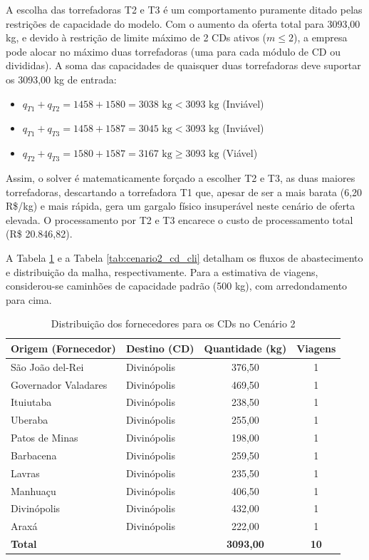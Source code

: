\documentclass[a4paper,11pt]{article}
\begin{document}
A escolha das torrefadoras T2 e T3 é um comportamento puramente ditado pelas restrições de capacidade do modelo. Com o aumento da oferta total para 3093,00 kg, e devido à restrição de limite máximo de 2 CDs ativos ($m \le 2$), a empresa pode alocar no máximo duas torrefadoras (uma para cada módulo de CD ou divididas). A soma das capacidades de quaisquer duas torrefadoras deve suportar os 3093,00 kg de entrada:
\begin{itemize}
    \item $q_{T1} + q_{T2} = 1458 + 1580 = 3038 \text{ kg} < 3093 \text{ kg}$ (Inviável)
    \item $q_{T1} + q_{T3} = 1458 + 1587 = 3045 \text{ kg} < 3093 \text{ kg}$ (Inviável)
    \item $q_{T2} + q_{T3} = 1580 + 1587 = 3167 \text{ kg} \ge 3093 \text{ kg}$ (Viável)
\end{itemize}

Assim, o solver é matematicamente forçado a escolher T2 e T3, as duas maiores torrefadoras, descartando a torrefadora T1 que, apesar de ser a mais barata (6,20 R\$/kg) e mais rápida, gera um gargalo físico insuperável neste cenário de oferta elevada. O processamento por T2 e T3 encarece o custo de processamento total (R\$ 20.846,82).

A Tabela \ref{tab:cenario2_forn_cd} e a Tabela \ref{tab:cenario2_cd_cli} detalham os fluxos de abastecimento e distribuição da malha, respectivamente. Para a estimativa de viagens, considerou-se caminhões de capacidade padrão (500 kg), com arredondamento para cima.

\begin{table}[H]
\centering
\begin{tabular}{llcc}
\hline
\textbf{Origem (Fornecedor)} & \textbf{Destino (CD)} & \textbf{Quantidade (kg)} & \textbf{Viagens} \\ \hline
São João del-Rei & Divinópolis & 376,50 & 1 \\
Governador Valadares & Divinópolis & 469,50 & 1 \\
Ituiutaba & Divinópolis & 238,50 & 1 \\
Uberaba & Divinópolis & 255,00 & 1 \\
Patos de Minas & Divinópolis & 198,00 & 1 \\
Barbacena & Divinópolis & 259,50 & 1 \\
Lavras & Divinópolis & 235,50 & 1 \\
Manhuaçu & Divinópolis & 406,50 & 1 \\
Divinópolis & Divinópolis & 432,00 & 1 \\
Araxá & Divinópolis & 222,00 & 1 \\ \hline
\textbf{Total} & & \textbf{3093,00} & \textbf{10} \\
\hline
\end{tabular}
\caption{Distribuição dos fornecedores para os CDs no Cenário 2}
\label{tab:cenario2_forn_cd}
\end{table}
\end{document}
